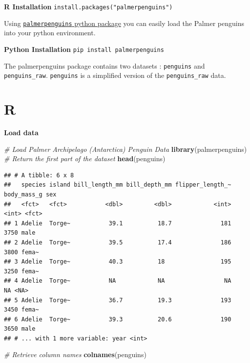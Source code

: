 \documentclass[]{book}
\newenvironment{Shaded}{\begin{snugshade}}{\end{snugshade}}
\newcommand{\CommentTok}[1]{\textcolor[rgb]{0.56,0.35,0.01}{\textit{#1}}}
\newcommand{\KeywordTok}[1]{\textcolor[rgb]{0.13,0.29,0.53}{\textbf{#1}}}
\newcommand{\NormalTok}[1]{#1}
\begin{document}
\textbf{R Installation}
\texttt{install.packages("palmerpenguins")}

Using \href{https://pypi.org/project/palmerpenguins/}{\texttt{palmerpenguins} python package} you can easily load the Palmer penguins into your python environment.

\textbf{Python Installation}
\texttt{pip\ install\ palmerpenguins}

The palmerpenguins package contains two datasets : \texttt{penguins} and \texttt{penguins\_raw}. \texttt{penguins} is a simplified version of the \texttt{penguins\_raw} data.

\hypertarget{r-5}{%
\section{R}\label{r-5}}

\textbf{Load data}

\begin{Shaded}
\begin{Highlighting}[]
\CommentTok{# Load Palmer Archipelago (Antarctica) Penguin Data}
\KeywordTok{library}\NormalTok{(palmerpenguins)}
\CommentTok{# Return the first part of the dataset}
\KeywordTok{head}\NormalTok{(penguins)}
\end{Highlighting}
\end{Shaded}

\begin{verbatim}
## # A tibble: 6 x 8
##   species island bill_length_mm bill_depth_mm flipper_length_~ body_mass_g sex  
##   <fct>   <fct>           <dbl>         <dbl>            <int>       <int> <fct>
## 1 Adelie  Torge~           39.1          18.7              181        3750 male 
## 2 Adelie  Torge~           39.5          17.4              186        3800 fema~
## 3 Adelie  Torge~           40.3          18                195        3250 fema~
## 4 Adelie  Torge~           NA            NA                 NA          NA <NA> 
## 5 Adelie  Torge~           36.7          19.3              193        3450 fema~
## 6 Adelie  Torge~           39.3          20.6              190        3650 male 
## # ... with 1 more variable: year <int>
\end{verbatim}

\begin{Shaded}
\begin{Highlighting}[]
\CommentTok{# Retrieve column names}
\KeywordTok{colnames}\NormalTok{(penguins)}
\end{Highlighting}
\end{Shaded}
\end{document}
